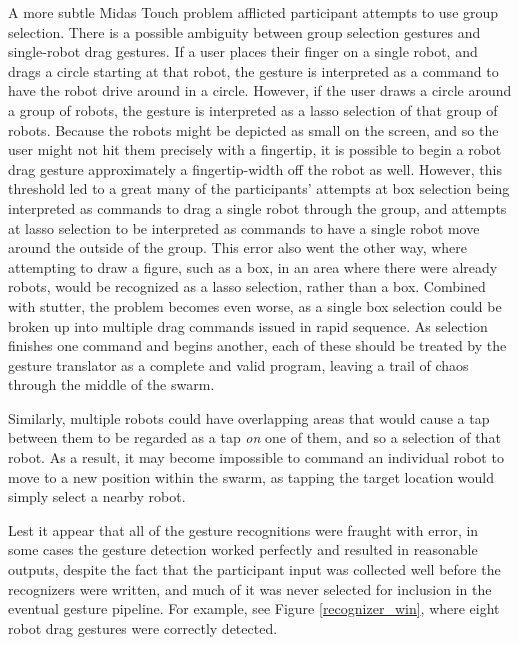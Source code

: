 A more subtle Midas Touch problem afflicted participant attempts to use group selection. 
There is a possible ambiguity between group selection gestures and single-robot drag gestures. 
If a user places their finger on a single robot, and drags a circle starting at that robot, the gesture is interpreted as a command to have the robot drive around in a circle.
However, if the user draws a circle around a group of robots, the gesture is interpreted as a lasso selection of that group of robots. 
Because the robots might be depicted as small on the screen, and so the user might not hit them precisely with a fingertip, it is possible to begin a robot drag gesture approximately a fingertip-width off the robot as well. 
However, this threshold led to a great many of the participants' attempts at box selection being interpreted as commands to drag a single robot through the group, and attempts at lasso selection to be interpreted as commands to have a single robot move around the outside of the group. 
This error also went the other way, where attempting to draw a figure, such as a box, in an area where there were already robots, would be recognized as a lasso selection, rather than a box.
Combined with stutter, the problem becomes even worse, as a single box selection could be broken up into multiple drag commands issued in rapid sequence. 
As selection finishes one command and begins another, each of these should be treated by the gesture translator as a complete and valid program, leaving a trail of chaos through the middle of the swarm. 

Similarly, multiple robots could have overlapping areas that would cause a tap between them to be regarded as a tap \emph{on} one of them, and so a selection of that robot.
As a result, it may become impossible to command an individual robot to move to a new position within the swarm, as tapping the target location would simply select a nearby robot. 

Lest it appear that all of the gesture recognitions were fraught with error, in some cases the gesture detection worked perfectly and resulted in reasonable outputs, despite the fact that the participant input was collected well before the recognizers were written, and much of it was never selected for inclusion in the eventual gesture pipeline. 
For example, see Figure \ref{recognizer_win}, where eight robot drag gestures were correctly detected.
 
